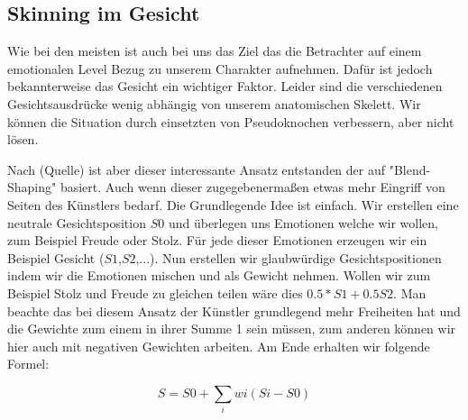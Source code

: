 \subsection{Skinning im Gesicht}

Wie bei den meisten ist auch bei uns das Ziel das die Betrachter auf einem emotionalen Level Bezug zu unserem Charakter aufnehmen. Dafür ist jedoch bekannterweise das Gesicht ein wichtiger Faktor. Leider sind die verschiedenen Gesichtsausdrücke wenig abhängig von unserem anatomischen Skelett. Wir können die Situation durch einsetzten von Pseudoknochen verbessern, aber nicht lösen.

Nach (Quelle) ist aber dieser interessante Ansatz entstanden der auf "Blend-Shaping" basiert. Auch wenn dieser zugegebenermaßen etwas mehr Eingriff von Seiten des Künstlers bedarf. Die Grundlegende Idee ist einfach. Wir erstellen eine neutrale Gesichtsposition $S0$ und überlegen uns Emotionen welche wir wollen, zum Beispiel Freude oder Stolz. Für jede dieser Emotionen erzeugen wir ein Beispiel Gesicht ($S1$,$S2$,...). Nun erstellen wir glaubwürdige Gesichtspositionen indem wir die Emotionen mischen und als Gewicht nehmen. Wollen wir zum Beispiel Stolz und Freude zu gleichen teilen wäre dies $0.5*S1+0.5S2$. Man beachte das bei diesem Ansatz der Künstler grundlegend mehr Freiheiten hat und die Gewichte zum einem in ihrer Summe 1 sein müssen, zum anderen können wir hier auch mit negativen Gewichten arbeiten. Am Ende erhalten wir folgende Formel:

\begin{equation}
\label{formel}
S=S0+\sum_{i}wi(Si-S0)
\end{equation}
